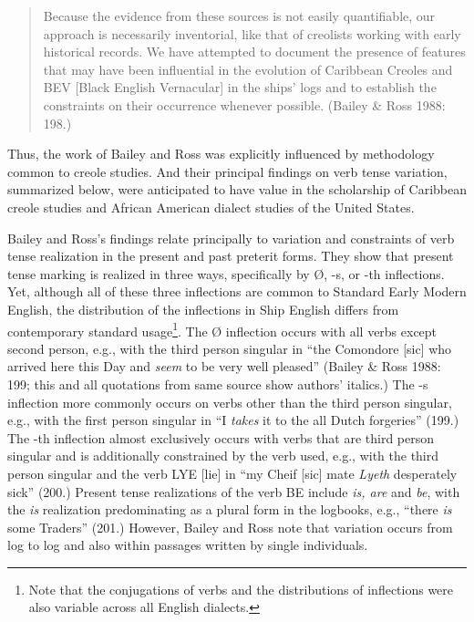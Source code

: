 \begin{quotation}
Because the evidence from these sources is not easily quantifiable, our approach is necessarily inventorial, like that of creolists working with early historical records. We have attempted to document the presence of features that may have been influential in the evolution of Caribbean Creoles and BEV [Black English Vernacular] in the ships’ logs and to establish the constraints on their occurrence whenever possible. (Bailey \& Ross 1988: 198.) 

\end{quotation}
\begin{styleStandard}
Thus, the work of Bailey and Ross was explicitly influenced by methodology common to creole studies. And their principal findings on verb tense variation, summarized below, were anticipated to have value in the scholarship of Caribbean creole studies and African American dialect studies of the United States.
\end{styleStandard}


\begin{styleStandard}
Bailey and Ross’s findings relate principally to variation and constraints of verb tense realization in the present and past preterit forms. They show that present tense marking is realized in three ways, specifically by Ø, -s, or -th inflections. Yet, although all of these three inflections are common to Standard Early Modern English, the distribution of the inflections in Ship English differs from contemporary standard usage\footnote{ Note that the conjugations of verbs and the distributions of inflections were also variable across all English dialects.}. The Ø inflection occurs with all verbs except second person, e.g., with the third person singular in “the Comondore [sic] who arrived here this Day and \textit{seem} to be very well pleased” (Bailey \& Ross 1988: 199; this and all quotations from same source show authors’ italics.) The -s inflection more commonly occurs on verbs other than the third person singular, e.g., with the first person singular in “I \textit{takes} it to the all Dutch forgeries” (199.) The -th inflection almost exclusively occurs with verbs that are third person singular and is additionally constrained by the verb used, e.g., with the third person singular and the verb LYE [lie] in “my Cheif [sic] mate\textit{ Lyeth} desperately sick” (200.) Present tense realizations of the verb BE include \textit{is, are }and\textit{ be}, with the\textit{ is} realization predominating as a plural form in the logbooks, e.g., “there \textit{is }some Traders” (201.) However, Bailey and Ross note that variation occurs from log to log and also within passages written by single individuals. 
\end{styleStandard}


